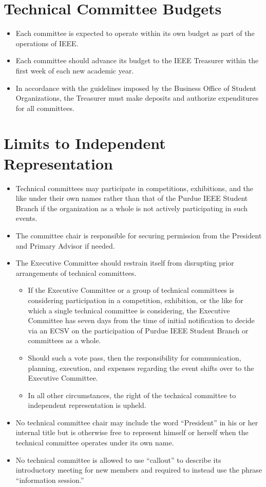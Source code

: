\documentclass[12pt]{constitution}
\begin{document}
\section{Technical Committee Budgets}
\label{sec:tech_budget}
\begin{itemize}
    \item Each committee is expected to operate within its own budget as part of the operations of IEEE.
    \item Each committee should advance its budget to the IEEE Treasurer within the first week of each new academic year.
    \item In accordance with the guidelines imposed by the Business Office of Student Organizations, the Treasurer must make deposits and authorize expenditures for all committees.
\end{itemize}

\section{Limits to Independent Representation}
\label{sec:tech_limrepres}
\begin{itemize}
    \item Technical committees may participate in competitions, exhibitions, and the like under their own names rather than that of the Purdue IEEE Student Branch if the organization as a whole is not actively participating in such events.
    \item The committee chair is responsible for securing permission from the President and Primary Advisor if needed.
    \item The Executive Committee should restrain itself from disrupting prior arrangements of technical committees.
    \begin{itemize}
        \item If the Executive Committee or a group of technical committees is considering participation in a competition, exhibition, or the like for which a single technical committee is considering, the Executive Committee has seven days from the time of initial notification to decide via an ECSV on the participation of Purdue IEEE Student Branch or committees as a whole.
        \item Should such a vote pass, then the responsibility for communication, planning, execution, and expenses regarding the event shifts over to the Executive Committee.
        \item In all other circumstances, the right of the technical committee to independent representation is upheld.
    \end{itemize}
    \item No technical committee chair may include the word ``President'' in his or her internal title but is otherwise free to represent himself or herself when the technical committee operates under its own name.
    \item No technical committee is allowed to use ``callout'' to describe its introductory meeting for new members and required to instead use the phrase ``information session.''
\end{itemize}
\end{document}

